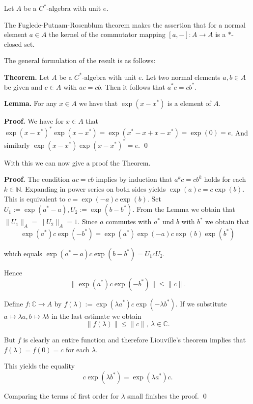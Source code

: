 \documentclass[12pt]{article}
\begin{document}
Let $A$ be a $C^{\ast}$-algebra with unit $e$.

The Fuglede-Putnam-Rosenblum theorem makes the assertion that for a normal element $a \in A$ the kernel of the commutator mapping $[a, -] \colon A \to A$ is a $\ast$-closed set. 

The general formulation of the result is as follows:

\textbf{Theorem.} Let $A$ be a $C^{\ast}$-algebra with unit $e$. Let two normal elements
$a, b \in A$ be given and $c \in A$ with $ac = cb$. 
Then it follows that $a^{\ast} c = c b^{\ast}$. 

\textbf{Lemma.} For any $x \in A$ we have that $\exp(x - x^{\ast})$ is a element of $A$.

\textbf{Proof.} We have for $x \in A$ that
$\exp(x - x^{\ast})^{\ast} \exp(x - x^{\ast}) = \exp(x^{\ast} - x + x - x^{\ast}) = \exp(0) = e$.
And similarly $\exp(x - x^{\ast}) \exp(x - x^{\ast})^{\ast} = e$. \qed

With this we can now give a proof the Theorem.

\textbf{Proof.} The condition $ac = cb$ implies by induction that $a^k c = c b^k$ holds for each $k \in \mathbb{N}$.
Expanding in power series on both sides yields $\exp(a) c = c \exp(b)$.
This is equivalent to $c = \exp(-a) c \exp(b)$. Set $U_1 := \exp(a^{\ast} - a), U_2 := \exp(b - b^{\ast})$. From the Lemma we obtain that $\|U_1\|_A = \|U_2\|_A = 1$. 
Since $a$ commutes with $a^{\ast}$ und $b$ with $b^{\ast}$ we obtain that
\[
\exp(a^{\ast}) c \exp(-b^{\ast}) = \exp(a^{\ast}) \exp(-a) c \exp(b) \exp(b^{\ast})
\]

which equals $\exp(a^{\ast} - a) c \exp(b - b^{\ast}) = U_1 c U_2$. 

Hence 
\[
\|\exp(a^{\ast}) c \exp(-b^{\ast})\| \leq \|c\|.
\]

Define $f \colon \mathbb{C} \to A$ by $f(\lambda) := \exp(\lambda a^{\ast}) c \exp(-\lambda b^{\ast})$. If we substitute $a \mapsto \lambda a, b \mapsto \lambda b$ in the last estimate we obtain
\[
\|f(\lambda)\| \leq \|c\|, \ \lambda \in \mathbb{C}. 
\]

But $f$ is clearly an entire function and therefore Liouville's theorem implies that $f(\lambda) = f(0) = c$ for each $\lambda$. 

This yields the equality
\[
c \exp(\lambda b^{\ast}) = \exp(\lambda a^{\ast}) c.
\]

Comparing the terms of first order for $\lambda$ small finishes the proof. \qed
\end{document}

